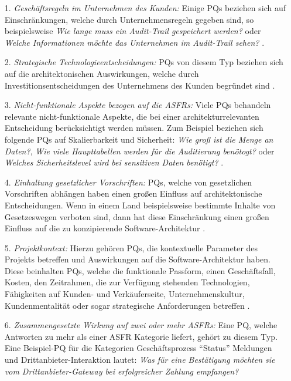 \begin{itemize}
\item[1.] \textit{Gesch\"aftsregeln im Unternehmen des Kunden:} Einige PQs beziehen sich auf Einschr\"ankungen, welche durch Unternehmensregeln gegeben sind, so beispielsweise \textit{Wie lange muss ein Audit-Trail gespeichert werden?} oder \textit{Welche Informationen m\"ochte das Unternehmen im Audit-Trail sehen?} \cite{Ros02}.
\item[2.] \textit{Strategische Technologieentscheidungen:} PQs von diesem Typ beziehen sich auf die architektonischen Auswirkungen, welche durch Investitionsentscheidungen des Unternehmens des Kunden begr\"undet sind \cite{Ros02}.
\item[3.] \textit{Nicht-funktionale Aspekte bezogen auf die ASFRs:} Viele PQs behandeln relevante nicht-funktionale Aspekte, die bei einer architekturrelevanten Entscheidung ber\"ucksichtigt werden m\"ussen. Zum Beispiel beziehen sich folgende PQs auf Skalierbarkeit und Sicherheit: \textit{Wie gro\ss{} ist die Menge an Daten?}, \textit{Wie viele Haupttabellen werden f\"ur die Auditierung ben\"otogt?} oder \textit{Welches Sicherheitslevel wird bei sensitiven Daten ben\"otigt?} \cite{Ros02}.
\item[4.] \textit{Einhaltung gesetzlicher Vorschriften:} PQs, welche von gesetzlichen Vorschriften abh\"angen haben einen gro\ss{}en Einfluss auf architektonische Entscheidungen. Wenn in einem Land beispielsweise bestimmte Inhalte von Gesetzeswegen verboten sind, dann hat diese Einschr\"ankung einen gro\ss{}en Einfluss auf die zu konzipierende Software-Architektur \cite{Ros02}.
\item[5.] \textit{Projektkontext:} Hierzu geh\"oren PQs, die kontextuelle Parameter des Projekts betreffen und Auswirkungen auf die Software-Architektur haben. Diese beinhalten PQs, welche die funktionale Passform, einen Gesch\"aftsfall, Kosten, den Zeitrahmen, die zur Verf\"ugung stehenden Technologien, F\"ahigkeiten auf Kunden- und Verk\"auferseite, Unternehmenskultur, Kundenmentalit\"at oder sogar strategische Anforderungen betreffen \cite{Ros02}.
\item[6.] \textit{Zusammengesetzte Wirkung auf zwei oder mehr ASFRs:} Eine PQ, welche Antworten zu mehr als einer ASFR Kategorie liefert, geh\"ort zu diesem Typ. Eine Beispiel-PQ f\"ur die Kategorien Gesch\"aftsprozess  ``Status'' Meldungen und Drittanbieter-Interaktion lautet: \textit{Was f\"ur eine Best\"atigung m\"ochten sie vom Drittanbieter-Gateway bei erfolgreicher Zahlung empfangen?} \cite{Ros02} \\
\end{itemize}

